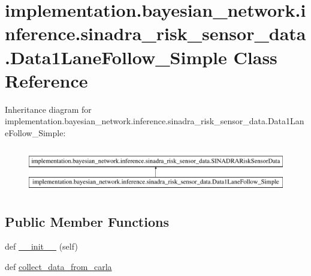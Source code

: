 \hypertarget{classimplementation_1_1bayesian__network_1_1inference_1_1sinadra__risk__sensor__data_1_1_data1_lane_follow___simple}{}\section{implementation.\+bayesian\+\_\+network.\+inference.\+sinadra\+\_\+risk\+\_\+sensor\+\_\+data.\+Data1\+Lane\+Follow\+\_\+\+Simple Class Reference}
\label{classimplementation_1_1bayesian__network_1_1inference_1_1sinadra__risk__sensor__data_1_1_data1_lane_follow___simple}
Inheritance diagram for implementation.\+bayesian\+\_\+network.\+inference.\+sinadra\+\_\+risk\+\_\+sensor\+\_\+data.\+Data1\+Lane\+Follow\+\_\+\+Simple\+:\begin{figure}[H]
\begin{center}
\leavevmode
\includegraphics[height=1.989343cm]{classimplementation_1_1bayesian__network_1_1inference_1_1sinadra__risk__sensor__data_1_1_data1_lane_follow___simple}
\end{center}
\end{figure}
\subsection*{Public Member Functions}
\begin{DoxyCompactItemize}
\item 
def \hyperlink{classimplementation_1_1bayesian__network_1_1inference_1_1sinadra__risk__sensor__data_1_1_data1_lane_follow___simple_a7f5f0d89e08e9605ebab8762ad3ab0fd}{\+\_\+\+\_\+init\+\_\+\+\_\+} (self)
\item 
def \hyperlink{classimplementation_1_1bayesian__network_1_1inference_1_1sinadra__risk__sensor__data_1_1_data1_lane_follow___simple_a393e099f3c1cba1f1deddfb5be1b5b94}{collect\+\_\+data\+\_\+from\+\_\+carla}
\end{DoxyCompactItemize}

